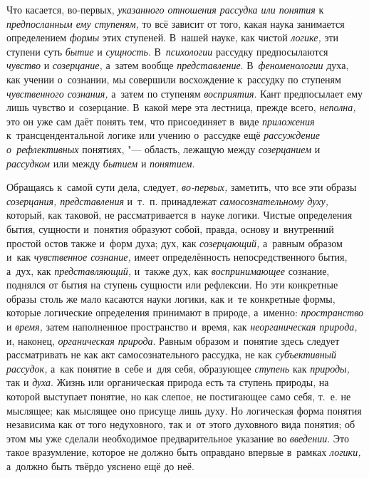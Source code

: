 Что касается, во-первых, {\em указанного отношения рассудка или понятия}
к {\em предпосланным ему ступеням,} то всё зависит от того, какая наука
занимается определением {\em формы} этих ступеней. В~нашей науке, как
чистой {\em логике,} эти ступени суть {\em бытие} и {\em сущность}.
В~{\em психологии} рассудку предпосылаются {\em чувство} и
{\em созерцание,} а~затем вообще {\em представление}. В~{\em феноменологии}
духа, как учении о~сознании, мы совершили восхождение к~рассудку по
ступеням {\em чувственного сознания,} а~затем по ступеням
{\em восприятия}. Кант предпосылает ему лишь чувство и~созерцание. В~какой
мере эта лестница, прежде всего, {\em неполна,} это он уже сам даёт
понять тем, что присоединяет в~виде {\em приложения} к~трансцендентальной
логике или учению о~рассудке ещё {\em рассуждение о~рефлективных}
понятиях, "--- область, лежащую между {\em созерцанием} и {\em рассудком}
или между {\em бытием} и {\em понятием}.

Обращаясь к~самой сути дела, следует, {\em во-первых,}
заметить, что все эти образы {\em созерцания, представления}
и~т.~п. принадлежат {\em самосознательному духу,}
который, как таковой, не рассматривается в~науке логики.
Чистые определения бытия, сущности и~понятия образуют собой, правда, основу
и~внутренний простой остов также и~форм духа; дух, как
{\em созерцающий,} а~равным образом и~как {\em чувственное сознание,}
имеет определённость непосредственного бытия, а~дух, как {\em представляющий,}
и~также дух, как {\em воспринимающее}
сознание, поднялся от бытия на ступень сущности или
рефлексии. Но эти конкретные образы столь же мало касаются науки логики,
как и~те конкретные формы, которые логические определения принимают в
природе, а~именно: {\em пространство} и {\em время,}
затем наполненное пространство и~время, как
{\em неорганическая природа,} и, наконец, {\em органическая природа}.
Равным образом и~понятие здесь следует рассматривать не как
акт самосознательного рассудка, не как {\em субъективный рассудок,}
а~как понятие в~себе и~для себя, образующее {\em ступень} как
{\em природы,} так и {\em духа}. Жизнь или
органическая природа есть та ступень природы, на которой выступает понятие,
но как слепое, не постигающее само себя, т.~е. не мыслящее; как мыслящее
оно присуще лишь духу. Но логическая форма понятия независима как от того
недуховного, так и~от этого духовного вида понятия; об этом мы уже сделали
необходимое предварительное указание во {\em введении}. Это такое
вразумление, которое не должно быть оправдано впервые в~рамках
{\em логики,} а~должно быть твёрдо уяснено ещё до неё.

